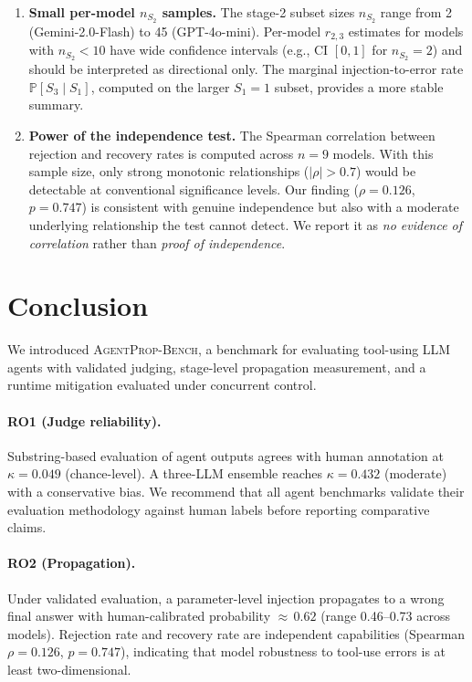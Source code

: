\documentclass[11pt]{article}
\newcommand{\bench}{\textsc{AgentProp-Bench}\xspace}
\renewcommand{\Pr}{\mathbb{P}}
\begin{document}
\begin{enumerate}
  \item \textbf{Small per-model $n_{S_2}$ samples.}
    The stage-2 subset sizes $n_{S_2}$ range from 2 (Gemini-2.0-Flash)
    to 45 (GPT-4o-mini).
    Per-model $r_{2,3}$ estimates for models with $n_{S_2} < 10$ have
    wide confidence intervals (e.g., CI $[0, 1]$ for $n_{S_2}{=}2$)
    and should be interpreted as directional only.
    The marginal injection-to-error rate $\Pr[S_3 \mid S_1]$, computed
    on the larger $S_1{=}1$ subset, provides a more stable summary.

  \item \textbf{Power of the independence test.}
    The Spearman correlation between rejection and recovery rates is
    computed across $n{=}9$ models.
    With this sample size, only strong monotonic relationships
    ($|\rho| > 0.7$) would be detectable at conventional significance
    levels.
    Our finding ($\rho{=}0.126$, $p{=}0.747$) is consistent with
    genuine independence but also with a moderate underlying relationship
    the test cannot detect.
    We report it as \emph{no evidence of correlation} rather than
    \emph{proof of independence}.
\end{enumerate}


\section{Conclusion}
\label{sec:conclusion}

We introduced \bench{}, a benchmark for evaluating tool-using LLM agents
with validated judging, stage-level propagation measurement, and a
runtime mitigation evaluated under concurrent control.

\paragraph{RO1 (Judge reliability).}
Substring-based evaluation of agent outputs agrees with human annotation
at $\kappa{=}0.049$ (chance-level).
A three-LLM ensemble reaches $\kappa{=}0.432$ (moderate) with a
conservative bias.
We recommend that all agent benchmarks validate their evaluation
methodology against human labels before reporting comparative claims.

\paragraph{RO2 (Propagation).}
Under validated evaluation, a parameter-level injection propagates to a
wrong final answer with human-calibrated probability ${\approx}\,0.62$
(range 0.46--0.73 across models).
Rejection rate and recovery rate are independent capabilities
(Spearman $\rho{=}0.126$, $p{=}0.747$), indicating that model
robustness to tool-use errors is at least two-dimensional.
\end{document}
